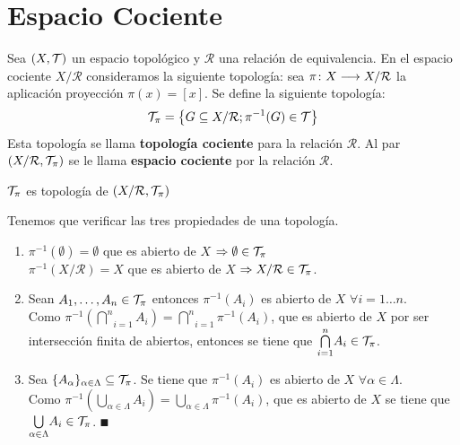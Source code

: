 \documentclass[GTS.tex]{subfiles}
\begin{document}
\section{Espacio Cociente}
Sea $(X,\mathcal{T})$ un espacio topológico y $\mathcal{R}$ una relación de equivalencia. En el espacio cociente $X/\mathcal{R}$ consideramos la siguiente topología: sea $\pi\colon{X}\longrightarrow{X/\mathcal{R}}$ la aplicación proyección $\pi(x)=[x]$. Se define la siguiente topología:
\begin{equation*}
\mathcal{T}_\pi=\left\{G\subseteq X/\mathcal{R};\pi^{-1}(G)\in\mathcal{T}\right\}
\end{equation*}
Esta topología se llama \textbf{topología cociente} para la relación $\mathcal{R}$. Al par $\left(X/\mathcal{R},\mathcal{T}_\pi\right)$ se le llama \textbf{espacio cociente} por la relación $\mathcal{R}$.
\begin{lemma}$\mathcal{T}_\pi$ es topología de $\left(X/\mathcal{R},\mathcal{T}_\pi\right)$
\end{lemma}
\begin{dem}
Tenemos que verificar las tres propiedades de una topología.
\begin{enumerate}
\item $\pi^{-1}(\emptyset)=\emptyset$ que es abierto de $X$ $\Rightarrow \emptyset\in\mathcal{T}_\pi$\\ $\pi^{-1}(X/\mathcal{R})=X$ que es abierto de $X$ $\Rightarrow X/\mathcal{R}\in\mathcal{T}_\pi$.
\item Sean $A_1,\dots,A_n\in\mathcal{T}_\pi$ entonces $\pi^{-1}(A_i)$ es abierto de $X$ $\forall i=1\dots n$.\\ Como $\pi^{-1}\left(\underset{i=1}{\overset{n}{\bigcap}}A_i\right)=\underset{i=1}{\overset{n}{\bigcap}}\pi^{-1}(A_i)$, que es abierto de $X$ por ser intersección finita de abiertos, entonces se tiene que $\underset{i=1}{\overset{n}{\bigcap}}A_i\in\mathcal{T}_\pi$.
\item Sea $\{A_\alpha\}_{\alpha\in\Lambda}\subseteq\mathcal{T}_\pi$. Se tiene que $\pi^{-1}(A_i)$ es abierto de $X$ $\forall\alpha\in\Lambda$.\\ Como $\pi^{-1}\left(\underset{\alpha\in\Lambda}{\bigcup}A_i\right)=\underset{\alpha\in\Lambda}{\bigcup}\pi^{-1}(A_i)$, que es abierto de $X$ se tiene que ${\underset{\alpha\in\Lambda}{\bigcup}}A_i\in\mathcal{T}_\pi$. $\QED$
\end{enumerate}
\end{dem}

\vspace{1cm}
\end{document}
